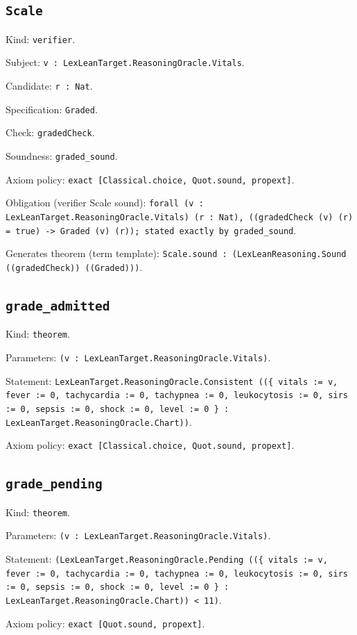 \documentclass[11pt]{article}
\begin{document}
\subsection*{\texttt{Scale}}
\noindent Kind: \texttt{verifier}.\par
\noindent Subject: \texttt{v : LexLeanTarget.ReasoningOracle.Vitals}.\par
\noindent Candidate: \texttt{r : Nat}.\par
\noindent Specification: \texttt{Graded}.\par
\noindent Check: \texttt{gradedCheck}.\par
\noindent Soundness: \texttt{graded\_sound}.\par
\noindent Axiom policy: \texttt{exact [Classical.choice, Quot.sound, propext]}.\par
\noindent Obligation (verifier Scale sound): \texttt{forall (v : LexLeanTarget.ReasoningOracle.Vitals) (r : Nat), ((gradedCheck (v) (r) = true) -> Graded (v) (r)); stated exactly by graded\_sound}.\par
\noindent Generates theorem (term template): \texttt{Scale.sound : (LexLeanReasoning.Sound ((gradedCheck)) ((Graded)))}.\par
\subsection*{\texttt{grade\_admitted}}
\noindent Kind: \texttt{theorem}.\par
\noindent Parameters: \texttt{(v : LexLeanTarget.ReasoningOracle.Vitals)}.\par
\noindent Statement: \texttt{LexLeanTarget.ReasoningOracle.Consistent ((\{ vitals := v, fever := 0, tachycardia := 0, tachypnea := 0, leukocytosis := 0, sirs := 0, sepsis := 0, shock := 0, level := 0 \} : LexLeanTarget.ReasoningOracle.Chart))}.\par
\noindent Axiom policy: \texttt{exact [Classical.choice, Quot.sound, propext]}.\par
\subsection*{\texttt{grade\_pending}}
\noindent Kind: \texttt{theorem}.\par
\noindent Parameters: \texttt{(v : LexLeanTarget.ReasoningOracle.Vitals)}.\par
\noindent Statement: \texttt{(LexLeanTarget.ReasoningOracle.Pending ((\{ vitals := v, fever := 0, tachycardia := 0, tachypnea := 0, leukocytosis := 0, sirs := 0, sepsis := 0, shock := 0, level := 0 \} : LexLeanTarget.ReasoningOracle.Chart)) < 11)}.\par
\noindent Axiom policy: \texttt{exact [Quot.sound, propext]}.\par
\end{document}
